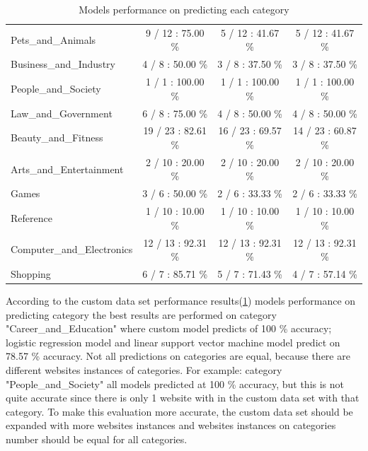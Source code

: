 \begin{enumerate}
\begin{table}[H]
\begin{tabular}{l|c|c|c|}
            Pets\_and\_Animals & 9 / 12 : 75.00 \% & 5 / 12 : 41.67 \% & 5 / 12 : 41.67 \% \\ \cline{2-4} 
            Business\_and\_Industry & 4 / 8 : 50.00 \% & 3 / 8 : 37.50 \% & 3 / 8 : 37.50 \% \\ \cline{2-4} 
            People\_and\_Society & 1 / 1 : 100.00 \% & 1 / 1 : 100.00 \% & 1 / 1 : 100.00 \% \\ \cline{2-4} 
            Law\_and\_Government & 6 / 8 : 75.00 \% & 4 / 8 : 50.00 \% & 4 / 8 : 50.00 \% \\ \cline{2-4} 
            Beauty\_and\_Fitness & 19 / 23 : 82.61 \% & 16 / 23 : 69.57 \% & 14 / 23 : 60.87 \% \\ \cline{2-4} 
            Arts\_and\_Entertainment & 2 / 10 : 20.00 \% & 2 / 10 : 20.00 \% & 2 / 10 : 20.00 \% \\ \cline{2-4} 
            Games & 3 / 6 : 50.00 \% & 2 / 6 : 33.33 \% & 2 / 6 : 33.33 \% \\ \cline{2-4} 
            Reference & 1 / 10 : 10.00 \% & 1 / 10 : 10.00 \% & 1 / 10 : 10.00 \% \\ \cline{2-4} 
            Computer\_and\_Electronics & 12 / 13 : 92.31 \% & 12 / 13 : 92.31 \% & 12 / 13 : 92.31 \% \\ \cline{2-4} 
            Shopping &  6 / 7 : 85.71 \% & 5 / 7 : 71.43 \% & 4 / 7 : 57.14 \% \\ \cline{2-4} 
        \end{tabular}
        \caption{Models performance on predicting each category}
        \label{table: custom_table}
    \end{table}
\end{enumerate}

According to the custom data set performance results(\ref{table: custom_table}) models performance on predicting category the best results are performed on category "Career\_and\_Education" where custom model predicts of 100 \% accuracy; logistic regression model and linear support vector machine model predict on 78.57 \% accuracy. Not all predictions on categories are equal, because there are different websites instances of categories. For example: category "People\_and\_Society" all models predicted at 100 \% accuracy, but this is not quite accurate since there is only 1 website with in the custom data set with that category. To make this evaluation more accurate, the custom data set should be expanded with more websites instances and websites instances on categories number should be equal for all categories.  

